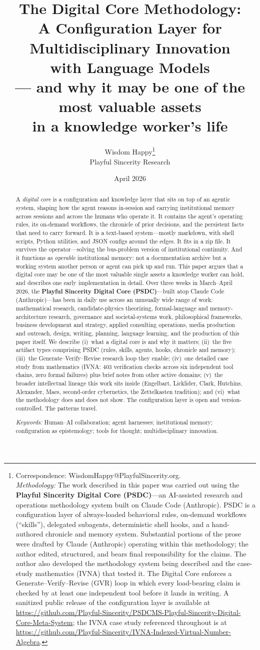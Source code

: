 \documentclass[12pt]{article}
\title{The Digital Core Methodology: \\
A Configuration Layer for Multidisciplinary Innovation \\
with Language Models \\[0.4em]
\large{--- and why it may be one of the most valuable assets \\
in a knowledge worker's life}}
\author{Wisdom Happy\thanks{Correspondence: WisdomHappy@PlayfulSincerity.org. \\[0.5em]
\textit{Methodology:} The work described in this paper was carried out using the \textbf{Playful Sincerity Digital Core (PSDC)}---an AI-assisted research and operations methodology system built on Claude Code (Anthropic). PSDC is a configuration layer of always-loaded behavioral rules, on-demand workflows (``skills''), delegated subagents, deterministic shell hooks, and a hand-authored chronicle and memory system. Substantial portions of the prose were drafted by Claude (Anthropic) operating within this methodology; the author edited, structured, and bears final responsibility for the claims. The author also developed the methodology system being described and the case-study mathematics (IVNA) that tested it. The Digital Core enforces a Generate--Verify--Revise (GVR) loop in which every load-bearing claim is checked by at least one independent tool before it lands in writing. A sanitized public release of the configuration layer is available at \url{https://github.com/Playful-Sincerity/PSDCMS-Playful-Sincerity-Digital-Core-Meta-System}; the IVNA case study referenced throughout is at \url{https://github.com/Playful-Sincerity/IVNA-Indexed-Virtual-Number-Algebra}.} \\[0.3em]
Playful Sincerity Research}
\date{April 2026}
\begin{document}
\maketitle

\begin{abstract}
A \emph{digital core} is a configuration and knowledge layer that sits on top of an agentic system, shaping how the agent reasons in-session and carrying institutional memory across sessions and across the humans who operate it. It contains the agent's operating rules, its on-demand workflows, the chronicle of prior decisions, and the persistent facts that need to carry forward. It is a text-based system---mostly markdown, with shell scripts, Python utilities, and JSON configs around the edges. It fits in a zip file. It survives the operator---solving the bus-problem version of institutional continuity. And it functions as \emph{operable} institutional memory: not a documentation archive but a working system another person or agent can pick up and run. This paper argues that a digital core may be one of the most valuable single assets a knowledge worker can hold, and describes one early implementation in detail. Over three weeks in March--April 2026, the \textbf{Playful Sincerity Digital Core (PSDC)}---built atop Claude Code (Anthropic)---has been in daily use across an unusually wide range of work: mathematical research, candidate-physics theorizing, formal-language and memory-architecture research, governance and societal-systems work, philosophical frameworks, business development and strategy, applied consulting operations, media production and outreach, design, writing, planning, language learning, and the production of this paper itself. We describe (i)~what a digital core is and why it matters; (ii)~the five artifact types comprising PSDC (rules, skills, agents, hooks, chronicle and memory); (iii)~the Generate--Verify--Revise research loop they enable; (iv)~one detailed case study from mathematics (IVNA: 403 verification checks across six independent tool chains, zero formal failures) plus brief notes from other active domains; (v)~the broader intellectual lineage this work sits inside (Engelbart, Licklider, Clark, Hutchins, Alexander, Maes, second-order cybernetics, the Zettelkasten tradition); and (vi)~what the methodology does and does not show. The configuration layer is open and version-controlled. The patterns travel.

\medskip
\noindent\textit{Keywords:} Human--AI collaboration; agent harnesses; institutional memory; configuration as epistemology; tools for thought; multidisciplinary innovation.
\end{abstract}
\end{document}
